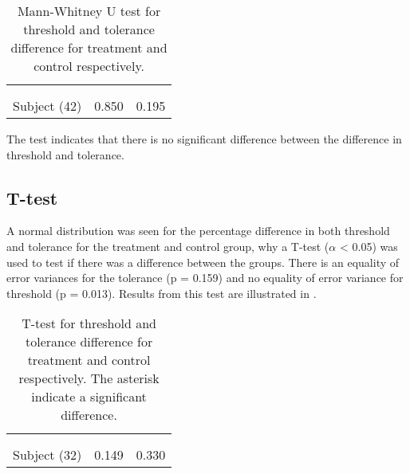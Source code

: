 \begin{longtable} {l|c|c}
	\caption{Mann-Whitney U test for threshold and tolerance difference for treatment and control respectively.}	\label{tab:MannWhitney1} \\ 
 \cellcolor[HTML]{C0C0C0} {} & 
 \multicolumn{1}{c|}{ \cellcolor[HTML]{C0C0C0}{\textbf{Threshold}}} & \multicolumn{1}{c}{ \cellcolor[HTML]{C0C0C0}{\textbf{Tolerance}}}  	\\  \rule{0pt}{3ex} 
  \cellcolor[HTML]{C0C0C0}{} &
 \multicolumn{1}{c|}{ \cellcolor[HTML]{C0C0C0}{Difference }} & \multicolumn{1}{|c}{ \cellcolor[HTML]{C0C0C0}{Difference}}  	\\ \hline
Subject (42) & 0.850 & 0.195 \\ \hline
\end{longtable}
\vspace{-.5cm}

The test indicates that there is no significant difference between the difference in threshold and tolerance.

\subsection{T-test}
A normal distribution was seen for the percentage difference in both threshold and tolerance for the treatment and control group, why a T-test ($\alpha$ < 0.05) was used to test if there was a difference between the groups. 
There is an equality of error variances for the tolerance (p = 0.159) and no equality of error variance for threshold (p = 0.013).
Results from this test are illustrated in .

\begin{longtable} {l|c|c}
	\caption{T-test for threshold and tolerance difference for treatment and control respectively. The asterisk indicate a significant difference.}	\label{tab:T-test1} \\
	 \cellcolor[HTML]{C0C0C0} {} & 
 \multicolumn{1}{c|}{ \cellcolor[HTML]{C0C0C0}{\textbf{Threshold}}} & \multicolumn{1}{c}{ \cellcolor[HTML]{C0C0C0}{\textbf{Tolerance}}}  	\\  \rule{0pt}{3ex} 
  \cellcolor[HTML]{C0C0C0}{} &
 \multicolumn{1}{c|}{ \cellcolor[HTML]{C0C0C0}{Difference }} & \multicolumn{1}{|c}{ \cellcolor[HTML]{C0C0C0}{Difference}}  	\\ \hline
Subject (32) & 0.149 & 0.330  \\ \hline

\end{longtable}
\vspace{-.5cm}


